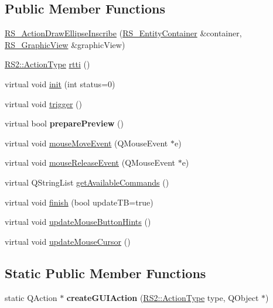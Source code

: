 \subsection*{Public Member Functions}
\begin{DoxyCompactItemize}
\item 
\hyperlink{classRS__ActionDrawEllipseInscribe_a9febdf31ec8bb9ea05c69f30a6b54559}{R\-S\-\_\-\-Action\-Draw\-Ellipse\-Inscribe} (\hyperlink{classRS__EntityContainer}{R\-S\-\_\-\-Entity\-Container} \&container, \hyperlink{classRS__GraphicView}{R\-S\-\_\-\-Graphic\-View} \&graphic\-View)
\item 
\hyperlink{classRS2_afe3523e0bc41fd637b892321cfc4b9d7}{R\-S2\-::\-Action\-Type} \hyperlink{classRS__ActionDrawEllipseInscribe_a850ddc89b0f729fbe21b5614a1781ead}{rtti} ()
\item 
virtual void \hyperlink{classRS__ActionDrawEllipseInscribe_a6113e039be9efceae6b81036611fa04b}{init} (int status=0)
\item 
virtual void \hyperlink{classRS__ActionDrawEllipseInscribe_a70ba2860b8adaa9f97ec86a634e929e6}{trigger} ()
\item 
\hypertarget{classRS__ActionDrawEllipseInscribe_a6e89f8c73894891da140fcf02ee7fc71}{virtual bool {\bfseries prepare\-Preview} ()}\label{classRS__ActionDrawEllipseInscribe_a6e89f8c73894891da140fcf02ee7fc71}

\item 
virtual void \hyperlink{classRS__ActionDrawEllipseInscribe_a5867997cf5173e2a414926e0772dd1cb}{mouse\-Move\-Event} (Q\-Mouse\-Event $\ast$e)
\item 
virtual void \hyperlink{classRS__ActionDrawEllipseInscribe_a1ee77570195c4ce2ea0bc09023b50a6d}{mouse\-Release\-Event} (Q\-Mouse\-Event $\ast$e)
\item 
virtual Q\-String\-List \hyperlink{classRS__ActionDrawEllipseInscribe_aa300bce6065f077c0e40653bb32920ba}{get\-Available\-Commands} ()
\item 
virtual void \hyperlink{classRS__ActionDrawEllipseInscribe_a082db97ba5e66a469f6bffe8b1b024d3}{finish} (bool update\-T\-B=true)
\item 
virtual void \hyperlink{classRS__ActionDrawEllipseInscribe_a955f9952e5e5c2a8519e63f3a45069f9}{update\-Mouse\-Button\-Hints} ()
\item 
virtual void \hyperlink{classRS__ActionDrawEllipseInscribe_a848d9dbe16b5f17444299702b4aa3806}{update\-Mouse\-Cursor} ()
\end{DoxyCompactItemize}
\subsection*{Static Public Member Functions}
\begin{DoxyCompactItemize}
\item 
\hypertarget{classRS__ActionDrawEllipseInscribe_a34cd29bf904e55bef4e3232f543e5b8d}{static Q\-Action $\ast$ {\bfseries create\-G\-U\-I\-Action} (\hyperlink{classRS2_afe3523e0bc41fd637b892321cfc4b9d7}{R\-S2\-::\-Action\-Type} type, Q\-Object $\ast$)}\label{classRS__ActionDrawEllipseInscribe_a34cd29bf904e55bef4e3232f543e5b8d}

\end{DoxyCompactItemize}
